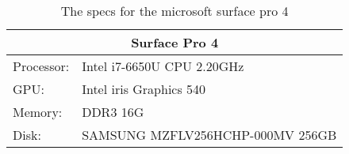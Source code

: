 \begin{table}[ht]
    \begin{tabular}{ll}
    \hline
    \multicolumn{2}{|c|}{Surface Pro 4}           \\ \hline
    Processor: & Intel i7-6650U CPU 2.20GHz       \\
    GPU:       & Intel iris Graphics 540          \\
    Memory:    & DDR3 16G                         \\
    Disk:      & SAMSUNG MZFLV256HCHP-000MV 256GB
    \end{tabular}
    \caption{The specs for the microsoft surface pro 4}
    \label{tab:surface}
    \end{table} 